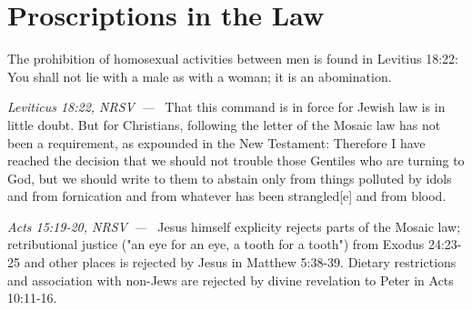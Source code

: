 \documentclass[10pt]{article}
\let\oldquote\quote
\let\endoldquote\endquote
\renewenvironment{quote}[2][]
  {\if\relax\detokenize{#1}\relax
     \def\quoteauthor{#2}%
   \else
     \def\quoteauthor{#2~---~#1}%
   \fi
   \oldquote}
  {\par\nobreak\smallskip\hfill\textit{\quoteauthor}%
   \endoldquote\addvspace{\bigskipamount}}
\begin{document}


\section*{Proscriptions in the Law}

The prohibition of homosexual activities between men is found in Levitius 18:22:
\begin{quote}{Leviticus 18:22, NRSV}
You shall not lie with a male as with a woman; it is an abomination. 
\end{quote}
That this command is in force for Jewish law is in little doubt. But for Christians, following the letter of the Mosaic law has not been a requirement, as expounded in the New Testament:
\begin{quote}{Acts 15:19-20, NRSV}
Therefore I have reached the decision that we should not trouble those Gentiles who are turning to God, but we should write to them to abstain only from things polluted by idols and from fornication and from whatever has been strangled[e] and from blood.
\end{quote}
Jesus himself explicity rejects parts of the Mosaic law;
retributional justice ("an eye for an eye, a tooth for a tooth") from Exodus 24:23-25 and other places is rejected by Jesus in Matthew 5:38-39. Dietary restrictions and association with non-Jews are rejected by divine revelation to Peter in Acts 10:11-16. 
\end{document}
